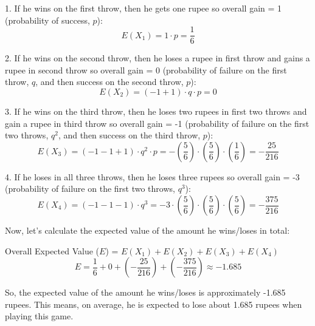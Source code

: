 \documentclass[journal,12pt,twocolumn]{IEEEtran}
\theoremstyle{remark}
\begin{document}
1. If he wins on the first throw, then he gets one rupee so overall gain = 1 (probability of success, $p$):
\[
E(X_1) = 1 \cdot p = \frac{1}{6}
\]

2. If he wins on the second throw, then he loses a rupee in first throw and gains a rupee in second throw so overall gain = 0 (probability of failure on the first throw, $q$, and then success on the second throw, $p$):
\[
E(X_2) = (-1 +1) \cdot q \cdot p = 0
\]

3. If he wins on the third throw, then he loses two rupees in first two throws and gain a rupee in third throw so overall gain = -1 (probability of failure on the first two throws, $q^2$, and then success on the third throw, $p$):
\[
E(X_3) = (-1 -1 +1) \cdot q^2 \cdot p = -\left(\frac{5}{6}\right) \cdot \left(\frac{5}{6}\right) \cdot \left(\frac{1}{6}\right) = -\frac{25}{216}
\]

4. If he loses in all three throws, then he loses three rupees so overall gain = -3 (probability of failure on the first two throws, $q^3$):
\[
E(X_4) = (-1 -1 -1) \cdot q^3 = -3 \cdot \left(\frac{5}{6}\right) \cdot \left(\frac{5}{6}\right) \cdot \left(\frac{5}{6}\right) = -\frac{375}{216}
\]

Now, let's calculate the expected value of the amount he wins/loses in total:

Overall Expected Value ($E$) = $E(X_1) + E(X_2) + E(X_3) + E(X_4)$
$$
E = \frac{1}{6} + 0 + \left(-\frac{25}{216}\right) + \left(-\frac{375}{216}\right)
  \approx -1.685
$$

So, the expected value of the amount he wins/loses is approximately -1.685 rupees. This means, on average, he is expected to lose about 1.685 rupees when playing this game.
\end{document}
